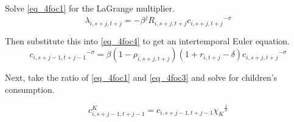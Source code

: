 \documentclass[letterpaper,12pt]{article}
\theoremstyle{definition}
\numberwithin{equation}{section}
\begin{document}
\begin{spacing}{1.5}
	Solve \eqref{eq_4foc1} for the LaGrange multiplier.
	\begin{equation}\label{eq_4lamdef}
	       \lambda_{i,s+j,t+j} = -\beta^j R_{i,s+j,t+j} {c_{i,s+j,t+j}}^{-\sigma}
	\end{equation}

	Then substitute this into \eqref{eq_4foc4} to get an intertemporal Euler equation.
	\begin{equation}
	       {c_{i,s+j-1,t+j-1}}^{-\sigma} = \beta (1-\rho_{i,s+j,t+j}) (1+r_{i,t+j}-\delta) {c_{i,s+j,t+j}}^{-\sigma}
	\end{equation}

	Next, take the ratio of \eqref{eq_4foc1} and \eqref{eq_4foc3} and solve for children's consumption.

	\begin{equation}
		c^K_{i,s+j-1,t+j-1} = c_{i,s+j-1,t+j-1} {\chi_K}^{\frac{1}{\sigma}} \label{eq_4cKdefnon}
 	\end{equation}


\end{spacing}
\end{document}
